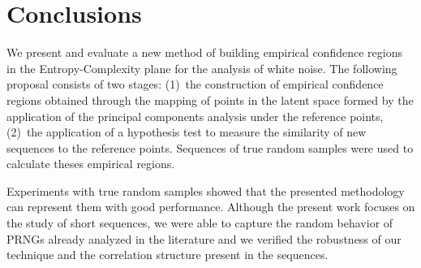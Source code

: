 \section{Conclusions}\label{Sec:Conclusions}

We present and evaluate a new method of building empirical confidence regions in the Entropy-Complexity plane for the analysis of white noise.
The following proposal consists of two stages:
(1)~the construction of empirical confidence regions obtained through the mapping of points in the latent space formed by the application of the principal components analysis under the reference points,
(2)~the application of a hypothesis test to measure the similarity of new sequences to the reference points.
Sequences of true random samples were used to calculate theses empirical regions.

Experiments with true random samples showed that the presented methodology can represent them with good performance.
Although the present work focuses on the study of short sequences, we were able to capture the random behavior of PRNGs already analyzed in the literature and we verified the robustness of our technique and the correlation structure present in the sequences.
